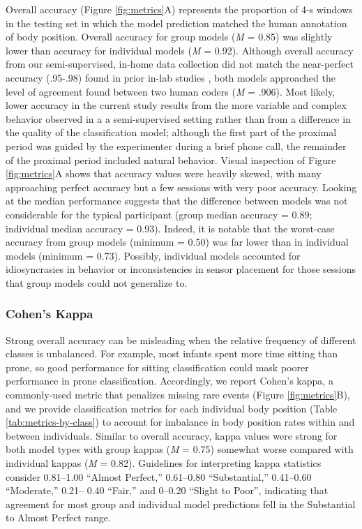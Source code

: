 \documentclass[
  man]{apa6}
\begin{document}
Overall accuracy (Figure \ref{fig:metrics}A) represents the proportion of 4-s windows in the testing set in which the model prediction matched the human annotation of body position. Overall accuracy for group models (\emph{M} = 0.85) was slightly lower than accuracy for individual models (\emph{M} = 0.92). Although overall accuracy from our semi-supervised, in-home data collection did not match the near-perfect accuracy (.95-.98) found in prior in-lab studies \autocite{FranchakScott2021,AiraksinenRasanen2020}, both models approached the level of agreement found between two human coders (\emph{M} = .906). Most likely, lower accuracy in the current study results from the more variable and complex behavior observed in a a semi-supervised setting rather than from a difference in the quality of the classification model; although the first part of the proximal period was guided by the experimenter during a brief phone call, the remainder of the proximal period included natural behavior. Visual inspection of Figure \ref{fig:metrics}A shows that accuracy values were heavily skewed, with many approaching perfect accuracy but a few sessions with very poor accuracy. Looking at the median performance suggests that the difference between models was not considerable for the typical participant (group median accuracy = 0.89; individual median accuracy = 0.93). Indeed, it is notable that the worst-case accuracy from group models (minimum = 0.50) was far lower than in individual models (minimum = 0.73). Possibly, individual models accounted for idiosyncrasies in behavior or inconsistencies in sensor placement for those sessions that group models could not generalize to.

\hypertarget{cohens-kappa}{%
\subsubsection{Cohen's Kappa}\label{cohens-kappa}}

Strong overall accuracy can be misleading when the relative frequency of different classes is unbalanced. For example, most infants spent more time sitting than prone, so good performance for sitting classification could mask poorer performance in prone classification. Accordingly, we report Cohen's kappa, a commonly-used metric that penalizes missing rare events (Figure \ref{fig:metrics}B), and we provide classification metrics for each individual body position (Table \ref{tab:metrics-by-class}) to account for imbalance in body position rates within and between individuals. Similar to overall accuracy, kappa values were strong for both model types with group kappas (\emph{M} = 0.75) somewhat worse compared with individual kappas (\emph{M} = 0.82). Guidelines for interpreting kappa statistics \autocite{LandisKoch1977} consider 0.81--1.00 ``Almost Perfect,'' 0.61--0.80 ``Substantial,'' 0.41--0.60 ``Moderate,'' 0.21-- 0.40 ``Fair,'' and 0--0.20 ``Slight to Poor'', indicating that agreement for most group and individual model predictions fell in the Substantial to Almost Perfect range.
\end{document}
